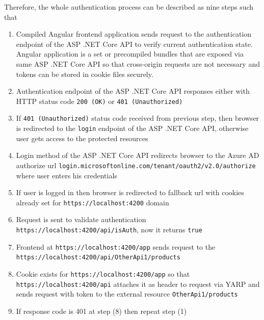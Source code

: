 Therefore, the whole authentication process can be described as nine steps such that
\begin{enumerate}
    \item Compiled Angular frontend application sends request to the authentication endpoint of the ASP .NET Core API
    to verify current authentication state.
    Angular application is a set or precompiled bundles that are exposed via same ASP .NET Core API
    so that cross-origin requests are not necessary and tokens can be stored in cookie files securely.
    \item Authentication endpoint of the ASP .NET Core API responses either with
    HTTP status code \texttt{200 (OK)} or \texttt{401 (Unauthorized)}
    \item If \texttt{401 (Unauthorized)} status code received from previous step,
    then browser is redirected to the \texttt{login} endpoint of the ASP .NET Core API,
    otherwise user gets access to the protected resources
    \item Login method of the ASP .NET Core API redirects browser to the Azure AD authorize url
    \texttt{login.microsoftonline.com/tenant/oauth2/v2.0/authorize} where user enters his credentials
    \item If user is logged in then browser is redirected to fallback url with cookies already set for \texttt{https://localhost:4200} domain
    \item Request is sent to validate authentication \texttt{https://localhost:4200/api/isAuth}, now it returns \texttt{true}
    \item Frontend at \texttt{https://localhost:4200/app} sends request to the \\ \texttt{https://localhost:4200/api/OtherApi1/products}
    \item Cookie exists for \texttt{https://localhost:4200/app} so that \\ \texttt{https://localhost:4200/api}
    attaches it as header to request via YARP and sends request with token to the external resource \texttt{OtherApi1/products}
    \item If response code is 401 at step (8) then repeat step (1)
\end{enumerate}